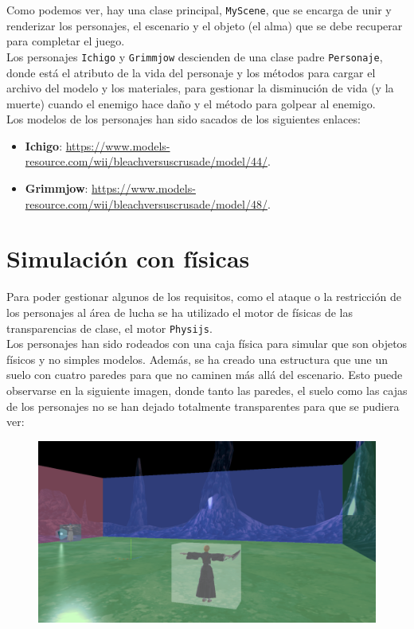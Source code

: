 \documentclass[11pt,a4paper]{article}
\begin{document}
Como podemos ver, hay una clase principal, \texttt{MyScene}, que se encarga de unir y renderizar los personajes, el escenario y el objeto (el alma) que se debe recuperar para completar el juego.\\

Los personajes \texttt{Ichigo} y \texttt{Grimmjow} descienden de una clase padre \texttt{Personaje}, donde está el atributo de la vida del personaje y los métodos para cargar el archivo del modelo y los materiales, para gestionar la disminución de vida (y la muerte) cuando el enemigo hace daño y el método para golpear al enemigo.\\

Los modelos de los personajes han sido sacados de los siguientes enlaces:

\begin{itemize}
	\item \textbf{Ichigo}: \color{blue}\url{https://www.models-resource.com/wii/bleachversuscrusade/model/44/}\color{black}.
	\item \textbf{Grimmjow}: \color{blue}\url{https://www.models-resource.com/wii/bleachversuscrusade/model/48/}\color{black}.
\end{itemize}

\section{Simulación con físicas}

Para poder gestionar algunos de los requisitos, como el ataque o la restricción de los personajes al área de lucha se ha utilizado el motor de físicas de las transparencias de clase, el motor \texttt{Physijs}.\\

Los personajes han sido rodeados con una caja física para simular que son objetos físicos y no simples modelos. 
Además, se ha creado una estructura que une un suelo con cuatro paredes para que no caminen más allá del escenario. Esto puede observarse en la siguiente imagen, donde tanto las paredes, el suelo como las cajas de los personajes no se han dejado totalmente transparentes para que se pudiera ver:

\begin{figure}[H]
	\centering
	\includegraphics[scale=0.27]{img/fisica.png}
\end{figure}
\end{document}
